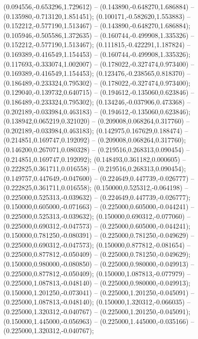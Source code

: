  (0.094556,-0.653296,1.729612) -- (0.143890,-0.648270,1.686884) -- (0.135980,-0.713120,1.851451);
 (0.100171,-0.582620,1.553883) -- (0.152212,-0.577190,1.513467) -- (0.143890,-0.648270,1.686884);
 (0.105946,-0.505586,1.372635) -- (0.160744,-0.499908,1.335326) -- (0.152212,-0.577190,1.513467);
 (0.111815,-0.422291,1.187824) -- (0.169389,-0.416549,1.154453) -- (0.160744,-0.499908,1.335326);
 (0.117693,-0.333074,1.002007) -- (0.178022,-0.327474,0.973400) -- (0.169389,-0.416549,1.154453);
 (0.123476,-0.238565,0.818370) -- (0.186489,-0.233324,0.795302) -- (0.178022,-0.327474,0.973400);
 (0.129040,-0.139732,0.640715) -- (0.194612,-0.135060,0.623846) -- (0.186489,-0.233324,0.795302);
 (0.134246,-0.037906,0.473368) -- (0.202189,-0.033984,0.463183) -- (0.194612,-0.135060,0.623846);
 (0.138942,0.065219,0.321020) -- (0.209008,0.068264,0.317760) -- (0.202189,-0.033984,0.463183);
 (0.142975,0.167629,0.188474) -- (0.214851,0.169747,0.192092) -- (0.209008,0.068264,0.317760);
 (0.146200,0.267071,0.080328) -- (0.219516,0.268313,0.090454) -- (0.214851,0.169747,0.192092);
 (0.148493,0.361182,0.000605) -- (0.222825,0.361711,0.016558) -- (0.219516,0.268313,0.090454);
 (0.149757,0.447649,-0.047600) -- (0.224649,0.447739,-0.026777) -- (0.222825,0.361711,0.016558);
 (0.150000,0.525312,-0.064198) -- (0.225000,0.525313,-0.039632) -- (0.224649,0.447739,-0.026777);
 (0.150000,0.605000,-0.071663) -- (0.225000,0.605000,-0.044241) -- (0.225000,0.525313,-0.039632);
 (0.150000,0.690312,-0.077060) -- (0.225000,0.690312,-0.047573) -- (0.225000,0.605000,-0.044241);
 (0.150000,0.781250,-0.080391) -- (0.225000,0.781250,-0.049629) -- (0.225000,0.690312,-0.047573);
 (0.150000,0.877812,-0.081654) -- (0.225000,0.877812,-0.050409) -- (0.225000,0.781250,-0.049629);
 (0.150000,0.980000,-0.080850) -- (0.225000,0.980000,-0.049913) -- (0.225000,0.877812,-0.050409);
 (0.150000,1.087813,-0.077979) -- (0.225000,1.087813,-0.048140) -- (0.225000,0.980000,-0.049913);
 (0.150000,1.201250,-0.073041) -- (0.225000,1.201250,-0.045091) -- (0.225000,1.087813,-0.048140);
 (0.150000,1.320312,-0.066035) -- (0.225000,1.320312,-0.040767) -- (0.225000,1.201250,-0.045091);
 (0.150000,1.445000,-0.056963) -- (0.225000,1.445000,-0.035166) -- (0.225000,1.320312,-0.040767);
